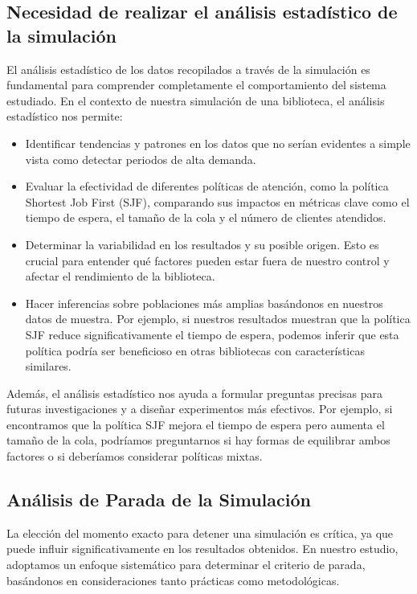 \documentclass[10pt,twocolumn]{article}
\begin{document}
\subsection{Necesidad de realizar el análisis estadístico de la simulación}
El análisis estadístico de los datos recopilados a través de la simulación es fundamental para comprender completamente el comportamiento del sistema estudiado. En el contexto de nuestra simulación de una biblioteca, el análisis estadístico nos permite:

\begin{itemize}
	\item Identificar tendencias y patrones en los datos que no serían evidentes a simple vista como detectar periodos de alta demanda.
	\item Evaluar la efectividad de diferentes políticas de atención, como la política Shortest Job First (SJF), comparando sus impactos en métricas clave como el tiempo de espera, el tamaño de la cola y el número de clientes atendidos.
	\item Determinar la variabilidad en los resultados y su posible origen. Esto es crucial para entender qué factores pueden estar fuera de nuestro control y afectar el rendimiento de la biblioteca.
	\item Hacer inferencias sobre poblaciones más amplias basándonos en nuestros datos de muestra. Por ejemplo, si nuestros resultados muestran que la política SJF reduce significativamente el tiempo de espera, podemos inferir que esta política podría ser beneficioso en otras bibliotecas con características similares.
\end{itemize}

Además, el análisis estadístico nos ayuda a formular preguntas precisas para futuras investigaciones y a diseñar experimentos más efectivos. Por ejemplo, si encontramos que la política SJF mejora el tiempo de espera pero aumenta el tamaño de la cola, podríamos preguntarnos si hay formas de equilibrar ambos factores o si deberíamos considerar políticas mixtas.

\subsection{Análisis de Parada de la Simulación}
La elección del momento exacto para detener una simulación es crítica, ya que puede influir significativamente en los resultados obtenidos. En nuestro estudio, adoptamos un enfoque sistemático para determinar el criterio de parada, basándonos en consideraciones tanto prácticas como metodológicas.
\end{document}
